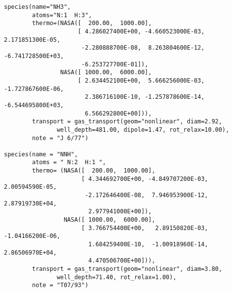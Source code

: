 \begin{verbatim}
species(name="NH3",
        atoms="N:1  H:3",
        thermo=(NASA([  200.00,  1000.00], 
                     [ 4.286027400E+00, -4.660523000E-03,  2.171851300E-05,
                      -2.280888700E-08,  8.263804600E-12, -6.741728500E+03,
                      -6.253727700E-01]),
                NASA([ 1000.00,  6000.00], 
                     [ 2.634452100E+00,  5.666256000E-03, -1.727867600E-06, 
                       2.386716100E-10, -1.257878600E-14, -6.544695800E+03,  
                       6.566292800E+00])),
        transport = gas_transport(geom="nonlinear", diam=2.92,
               well_depth=481.00, dipole=1.47, rot_relax=10.00),
        note = "J 6/77")

species(name = "NNH",
        atoms = " N:2  H:1 ",
        thermo= (NASA([  200.00,  1000.00], 
                      [ 4.344692700E+00, -4.849707200E-03,  2.00594590E-05,
                       -2.172646400E-08,  7.946953900E-12,  2.87919730E+04,
                        2.977941000E+00]),
                 NASA([ 1000.00,  6000.00], 
                      [ 3.766754400E+00,   2.89150820E-03, -1.04166200E-06, 
                        1.684259400E-10,  -1.00918960E-14,  2.86506970E+04,
                        4.470506700E+00])),
        transport = gas_transport(geom="nonlinear", diam=3.80,
               well_depth=71.40, rot_relax=1.00),
        note = "T07/93")
\end{verbatim}

\endinput